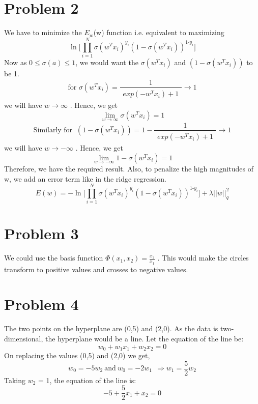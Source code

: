 \documentclass[11pt, a4paper, fleqn]{article}
\begin{document}
\begin{singlespacing}
\section{Problem 2}
We have to minimize the $E_w$(w) function i.e. equivalent to maximizing 
\begin{equation*}
\ln {\Big[\prod_{i=1}^{N}{\sigma(w^T x_i)^\text{$y_i$}(1 - \sigma(w^T x_i))^\text{1-$y_i$}}\Big] }
\end{equation*}
Now as $0 \leq \sigma(a) \leq 1 $, we would want the $\sigma(w^T x_i)$ and $(1 - \sigma(w^T x_i))$ to be 1.
\begin{equation*}
\text{for  } \sigma(w^T x_i) = \frac{\substack{1}}{\substack{exp(-w^T x_i) +1}} \rightarrow 1 
\end{equation*}
we will have $w \rightarrow \infty$ . Hence, we get
\begin{equation}
 \lim_{w\to\infty} \sigma(w^T x_i) = 1
\end{equation}
\begin{equation*}
\text{Similarly for  } \ (1-  \sigma(w^T x_i)) = 1 - \frac{\substack{1}}{\substack{exp(-w^T x_i) +1}} \rightarrow 1 
\end{equation*}
we will have $w \rightarrow -\infty$ . Hence, we get
\begin{equation}
 \lim_{w\to -\infty} 1 - \sigma(w^T x_i) = 1
\end{equation}
Therefore, we have the required result. Also, to penalize the high magnitudes of w, we add an error term like in the ridge regression.
\begin{equation*}
E(w) = -\ln {\Big[\prod_{i=1}^{N}{\sigma(w^T x_i)^\text{$y_i$}(1 - \sigma(w^T x_i))^\text{1-$y_i$}}\Big] } + \lambda||w||^2_q
\end{equation*}

\section{Problem 3}
We could use the basis function $\Phi(x_1,x_2) = \frac{x_2}{x_1}$ . This would make the circles transform to positive values and crosses to negative values.

\section{Problem 4}
The two points on the hyperplane are (0,5) and (2,0). As the data is two-dimensional, the hyperplane would be a line. Let the equation of the line be:
\begin{equation*}
w_0+w_1 x_1+w_2 x_2 =0 
\end{equation*}
On replacing the values (0,5) and (2,0) we get, 
\begin{equation*}
w_0 = -5w_2 \ \text{and} \ w_0 = -2w_1 \ \ \Rightarrow w_1 = \frac{5}{2}w_2
\end{equation*}
Taking $w_2$ = 1, the equation of the line is:
\begin{equation*}
-5 + \frac{5}{2} x_1+ x_2 =0 
\end{equation*}
\end{singlespacing}
\end{document}
